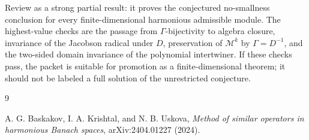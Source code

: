 \documentclass[11pt]{article}
\begin{document}
Review as a strong partial result: it proves the conjectured no-smallness
conclusion for every finite-dimensional harmonious admissible module.  The
highest-value checks are the passage from \(\Gamma\)-bijectivity to algebra
closure, invariance of the Jacobson radical under \(D\), preservation of
\(\mathcal M^k\) by \(\Gamma=D^{-1}\), and the two-sided domain invariance of
the polynomial intertwiner.  If these checks pass, the packet is suitable for
promotion as a finite-dimensional theorem; it should not be labeled a full
solution of the unrestricted conjecture.

\begin{thebibliography}{9}

A. G. Baskakov, I. A. Krishtal, and N. B. Uskova,
\emph{Method of similar operators in harmonious Banach spaces},
arXiv:2404.01227 (2024).

\end{thebibliography}
\end{document}

